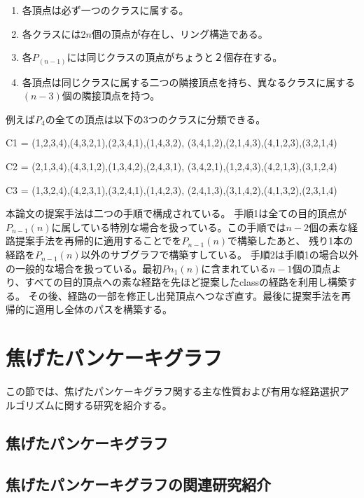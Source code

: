 \documentclass[11pt,a4j]{jsarticle}
\theoremstyle{plain}
\begin{document}
\begin{enumerate}
 \item 各頂点は必ず一つのクラスに属する。
 \item 各クラスには2$n$個の頂点が存在し、リング構造である。
 \item 各$P_(n-1)$には同じクラスの頂点がちょうと２個存在する。
 \item 各頂点は同じクラスに属する二つの隣接頂点を持ち、異なるクラスに属する$(n-3)$個の隣接頂点を持つ。
\end{enumerate}

例えば$P_4$の全ての頂点は以下の3つのクラスに分類できる。
\begin{description}
\item {C1} = {(1,2,3,4),(4,3,2,1),(2,3,4,1),(1,4,3,2), (3,4,1,2),(2,1,4,3),(4,1,2,3),(3,2,1,4)}
\item {C2} = {(2,1,3,4),(4,3,1,2),(1,3,4,2),(2,4,3,1), (3,4,2,1),(1,2,4,3),(4,2,1,3),(3,1,2,4)}
\item {C3} = {(1,3,2,4),(4,2,3,1),(3,2,4,1),(1,4,2,3), (2,4,1,3),(3,1,4,2),(4,1,3,2),(2,3,1,4)}
\end{description}
本論文\cite{pan-n2s}の提案手法は二つの手順で構成されている。
手順1は全ての目的頂点が$P_{n-1}(n)$に属している特別な場合を扱っている。この手順では$n-2$個の素な経路提案手法を再帰的に適用することでを$P_{n-1}(n)$で構築したあと、
残り1本の経路を$P_{n-1}(n)$以外のサブグラフで構築すしている。
手順2は手順1の場合以外の一般的な場合を扱っている。最初$P{n_1}(n)$に含まれている$n-1$個の頂点より、すべての目的頂点への素な経路を先ほど提案したclassの経路を利用し構築する。
その後、経路の一部を修正し出発頂点へつなぎ直す。最後に提案手法を再帰的に適用し全体のパスを構築する。


\section{焦げたパンケーキグラフ}
この節では、焦げたパンケーキグラフ関する主な性質および有用な経路選択アルゴリズムに関する研究を紹介する。
\subsection{焦げたパンケーキグラフ}

\subsection{焦げたパンケーキグラフの関連研究紹介}

\end{document}

